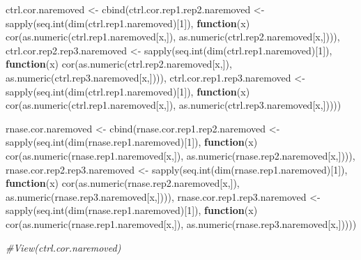 \documentclass[
]{article}
\newenvironment{Shaded}{\begin{snugshade}}{\end{snugshade}}
\newcommand{\CommentTok}[1]{\textcolor[rgb]{0.56,0.35,0.01}{\textit{#1}}}
\newcommand{\ControlFlowTok}[1]{\textcolor[rgb]{0.13,0.29,0.53}{\textbf{#1}}}
\newcommand{\DecValTok}[1]{\textcolor[rgb]{0.00,0.00,0.81}{#1}}
\newcommand{\FunctionTok}[1]{\textcolor[rgb]{0.00,0.00,0.00}{#1}}
\newcommand{\NormalTok}[1]{#1}
\newcommand{\OtherTok}[1]{\textcolor[rgb]{0.56,0.35,0.01}{#1}}
\begin{document}
\begin{Shaded}
\begin{Highlighting}[]
\NormalTok{ctrl.cor.naremoved }\OtherTok{\textless{}{-}} 
  \FunctionTok{cbind}\NormalTok{(ctrl.cor.rep1.rep2.naremoved }\OtherTok{\textless{}{-}} 
          \FunctionTok{sapply}\NormalTok{(}\FunctionTok{seq.int}\NormalTok{(}\FunctionTok{dim}\NormalTok{(ctrl.rep1.naremoved)[}\DecValTok{1}\NormalTok{]), }\ControlFlowTok{function}\NormalTok{(x) }\FunctionTok{cor}\NormalTok{(}\FunctionTok{as.numeric}\NormalTok{(ctrl.rep1.naremoved[x,]), }\FunctionTok{as.numeric}\NormalTok{(ctrl.rep2.naremoved[x,]))),}
\NormalTok{        ctrl.cor.rep2.rep3.naremoved }\OtherTok{\textless{}{-}} 
          \FunctionTok{sapply}\NormalTok{(}\FunctionTok{seq.int}\NormalTok{(}\FunctionTok{dim}\NormalTok{(ctrl.rep1.naremoved)[}\DecValTok{1}\NormalTok{]), }\ControlFlowTok{function}\NormalTok{(x) }\FunctionTok{cor}\NormalTok{(}\FunctionTok{as.numeric}\NormalTok{(ctrl.rep2.naremoved[x,]), }\FunctionTok{as.numeric}\NormalTok{(ctrl.rep3.naremoved[x,]))), }
\NormalTok{        ctrl.cor.rep1.rep3.naremoved }\OtherTok{\textless{}{-}} 
          \FunctionTok{sapply}\NormalTok{(}\FunctionTok{seq.int}\NormalTok{(}\FunctionTok{dim}\NormalTok{(ctrl.rep1.naremoved)[}\DecValTok{1}\NormalTok{]), }\ControlFlowTok{function}\NormalTok{(x) }\FunctionTok{cor}\NormalTok{(}\FunctionTok{as.numeric}\NormalTok{(ctrl.rep1.naremoved[x,]), }\FunctionTok{as.numeric}\NormalTok{(ctrl.rep3.naremoved[x,]))))}

\NormalTok{rnase.cor.naremoved }\OtherTok{\textless{}{-}} 
  \FunctionTok{cbind}\NormalTok{(rnase.cor.rep1.rep2.naremoved }\OtherTok{\textless{}{-}} 
         \FunctionTok{sapply}\NormalTok{(}\FunctionTok{seq.int}\NormalTok{(}\FunctionTok{dim}\NormalTok{(rnase.rep1.naremoved)[}\DecValTok{1}\NormalTok{]), }\ControlFlowTok{function}\NormalTok{(x) }\FunctionTok{cor}\NormalTok{(}\FunctionTok{as.numeric}\NormalTok{(rnase.rep1.naremoved[x,]), }\FunctionTok{as.numeric}\NormalTok{(rnase.rep2.naremoved[x,]))),}
\NormalTok{        rnase.cor.rep2.rep3.naremoved }\OtherTok{\textless{}{-}} 
          \FunctionTok{sapply}\NormalTok{(}\FunctionTok{seq.int}\NormalTok{(}\FunctionTok{dim}\NormalTok{(rnase.rep1.naremoved)[}\DecValTok{1}\NormalTok{]), }\ControlFlowTok{function}\NormalTok{(x) }\FunctionTok{cor}\NormalTok{(}\FunctionTok{as.numeric}\NormalTok{(rnase.rep2.naremoved[x,]), }\FunctionTok{as.numeric}\NormalTok{(rnase.rep3.naremoved[x,]))), }
\NormalTok{        rnase.cor.rep1.rep3.naremoved }\OtherTok{\textless{}{-}} 
          \FunctionTok{sapply}\NormalTok{(}\FunctionTok{seq.int}\NormalTok{(}\FunctionTok{dim}\NormalTok{(rnase.rep1.naremoved)[}\DecValTok{1}\NormalTok{]), }\ControlFlowTok{function}\NormalTok{(x) }\FunctionTok{cor}\NormalTok{(}\FunctionTok{as.numeric}\NormalTok{(rnase.rep1.naremoved[x,]), }\FunctionTok{as.numeric}\NormalTok{(rnase.rep3.naremoved[x,]))))}

\CommentTok{\#View(ctrl.cor.naremoved)}
\end{Highlighting}
\end{Shaded}
\end{document}

